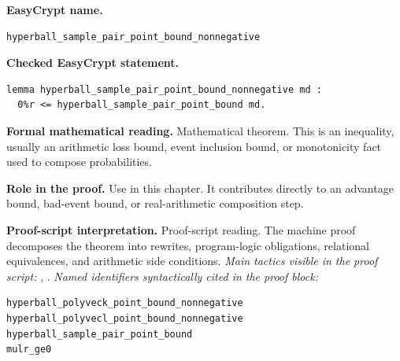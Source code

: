 \begin{formaltheorem}
\noindent\textbf{EasyCrypt name.}
\begin{lstlisting}[language=EasyCrypt,basicstyle=\ttfamily\scriptsize]
hyperball_sample_pair_point_bound_nonnegative
\end{lstlisting}
\noindent\textbf{Checked EasyCrypt statement.}
\begin{lstlisting}[language=EasyCrypt,basicstyle=\ttfamily\scriptsize]
lemma hyperball_sample_pair_point_bound_nonnegative md :
  0%r <= hyperball_sample_pair_point_bound md.
\end{lstlisting}
\noindent\textbf{Formal mathematical reading.}
Mathematical theorem. This is an inequality, usually an arithmetic loss bound, event inclusion bound, or monotonicity fact used to compose probabilities.

\noindent\textbf{Role in the proof.}
Use in this chapter. It contributes directly to an advantage bound, bad-event bound, or real-arithmetic composition step.

\noindent\textbf{Proof-script interpretation.}
Proof-script reading. The machine proof decomposes the theorem into rewrites, program-logic obligations, relational equivalences, and arithmetic side conditions.
\emph{Main tactics visible in the proof script:} , .
\emph{Named identifiers syntactically cited in the proof block:}
\begin{lstlisting}[language=EasyCrypt,basicstyle=\ttfamily\scriptsize]
hyperball_polyveck_point_bound_nonnegative
hyperball_polyvecl_point_bound_nonnegative
hyperball_sample_pair_point_bound
mulr_ge0
\end{lstlisting}

\end{formaltheorem}

